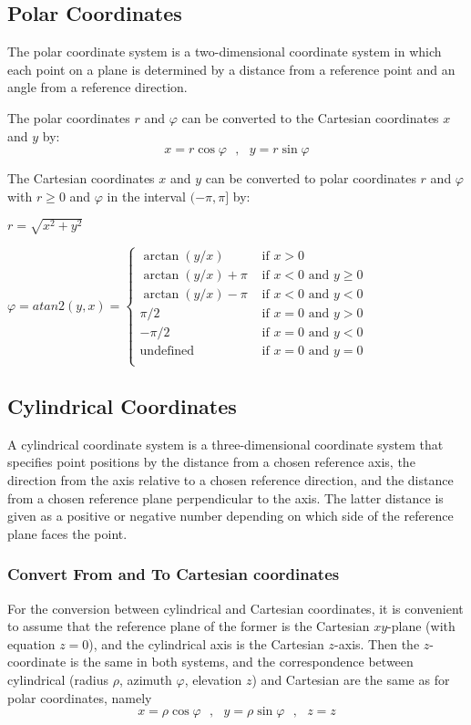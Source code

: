\subsection{Polar Coordinates}
The polar coordinate system is a two-dimensional coordinate system in which each point on a plane is determined by a distance from a reference point and an angle from a reference direction.

The polar coordinates $r$ and $\varphi$ can be converted to the Cartesian coordinates $x$ and $y$ by:
\[
x=r\cos \varphi  ~~~, ~~~ y=r\sin \varphi
\]

The Cartesian coordinates $x$ and $y$ can be converted to polar coordinates $r$ and $\varphi$ with $r \ge 0$ and $\varphi$ in the interval $(-\pi, \pi]$ by:

$ \displaystyle r= \sqrt{ x^2 + y^2 } $

$ \displaystyle \varphi = atan2(y,x) = 
\begin{cases}
\arctan(y/x) & \text{ if } x>0 \\
\arctan(y/x) + \pi & \text{ if } x<0 \text{ and } y\ge0\\
\arctan(y/x) - \pi & \text{ if } x<0 \text{ and } y<0\\
\pi/2 & \text{ if } x=0 \text{ and } y>0\\
-\pi/2 & \text{ if } x=0 \text{ and } y<0\\
\text{undefined} & \text{ if } x=0 \text{ and } y=0\\
\end{cases}
$



\subsection{Cylindrical Coordinates}
A cylindrical coordinate system is a three-dimensional coordinate system that specifies point positions by the distance from a chosen reference axis, the direction from the axis relative to a chosen reference direction, and the distance from a chosen reference plane perpendicular to the axis. The latter distance is given as a positive or negative number depending on which side of the reference plane faces the point.

\subsubsection{Convert From and To Cartesian coordinates}
For the conversion between cylindrical and Cartesian coordinates, it is convenient to assume that the reference plane of the former is the Cartesian $xy$-plane (with equation $z = 0$), and the cylindrical axis is the Cartesian $z$-axis. Then the $z$-coordinate is the same in both systems, and the correspondence between cylindrical (radius $\rho$, azimuth $\varphi$, elevation $z$) and Cartesian are the same as for polar coordinates, namely
\[
x=\rho \cos \varphi  ~~~, ~~~ y=\rho \sin \varphi ~~~, ~~~ z=z
\]

